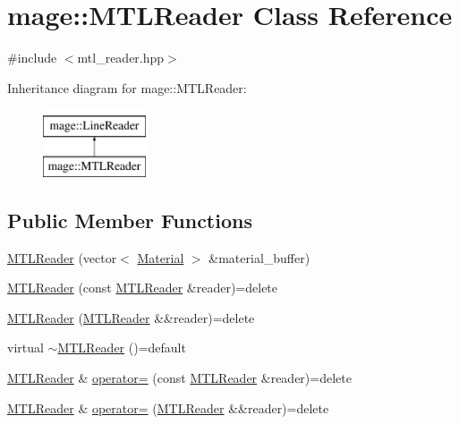 \hypertarget{classmage_1_1_m_t_l_reader}{}\section{mage\+:\+:M\+T\+L\+Reader Class Reference}
\label{classmage_1_1_m_t_l_reader}


{\ttfamily \#include $<$mtl\+\_\+reader.\+hpp$>$}

Inheritance diagram for mage\+:\+:M\+T\+L\+Reader\+:\begin{figure}[H]
\begin{center}
\leavevmode
\includegraphics[height=2.000000cm]{classmage_1_1_m_t_l_reader}
\end{center}
\end{figure}
\subsection*{Public Member Functions}
\begin{DoxyCompactItemize}
\item 
\hyperlink{classmage_1_1_m_t_l_reader_a924f813cca170e2592a6e7d2a3255be8}{M\+T\+L\+Reader} (vector$<$ \hyperlink{structmage_1_1_material}{Material} $>$ \&material\+\_\+buffer)
\item 
\hyperlink{classmage_1_1_m_t_l_reader_adcc57156298b2198c24c041503df2e6d}{M\+T\+L\+Reader} (const \hyperlink{classmage_1_1_m_t_l_reader}{M\+T\+L\+Reader} \&reader)=delete
\item 
\hyperlink{classmage_1_1_m_t_l_reader_ae78095773cf6c4cb697605b395fdfc60}{M\+T\+L\+Reader} (\hyperlink{classmage_1_1_m_t_l_reader}{M\+T\+L\+Reader} \&\&reader)=delete
\item 
virtual \hyperlink{classmage_1_1_m_t_l_reader_af07011b505c88680a8381c00cb512242}{$\sim$\+M\+T\+L\+Reader} ()=default
\item 
\hyperlink{classmage_1_1_m_t_l_reader}{M\+T\+L\+Reader} \& \hyperlink{classmage_1_1_m_t_l_reader_ae239ac085326919918a418edabcafeae}{operator=} (const \hyperlink{classmage_1_1_m_t_l_reader}{M\+T\+L\+Reader} \&reader)=delete
\item 
\hyperlink{classmage_1_1_m_t_l_reader}{M\+T\+L\+Reader} \& \hyperlink{classmage_1_1_m_t_l_reader_aa777389ff4a3cd2f1df2cbf5c6da708e}{operator=} (\hyperlink{classmage_1_1_m_t_l_reader}{M\+T\+L\+Reader} \&\&reader)=delete
\end{DoxyCompactItemize}
